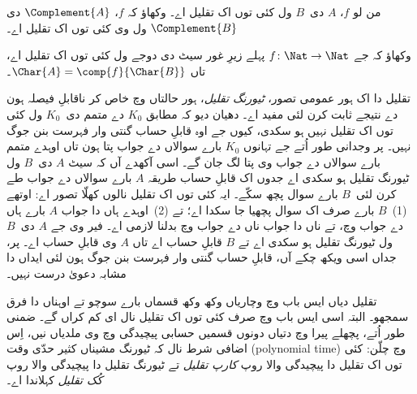 \documentclass[../../../include/open-logic-section]{subfiles}
\begin{document}
\begin{prob}
من لو $f$، $A$ دی~$B$ ول کئی
توں اک تقلیل اے۔ وکھاؤ کہ $f$،
$\Complement{A}$ دی
$\Complement{B}$ ول وی کئی توں
اک تقلیل اے۔
\end{prob}

\begin{prob}
وکھاؤ کہ جے $f\colon \Nat \to \Nat$
پہلے زیرِ غور سیٹ دی دوجے ول
کئی توں اک تقلیل اے، تاں $\Char{A}
= \comp{f}{\Char{B}}$۔
\end{prob}

\begin{digress}
تقلیل دا اک ہور عمومی تصور،
\emph{ٹیورنگ تقلیل}، ہور حالتاں وچ
خاص کر ناقابلِ فیصلہ ہون دے نتیجے
ثابت کرن لئی مفید اے۔ دھیان دیو
کہ  مطابق
$K_0$ دے متمم دی~$K_0$ ول کئی توں اک
تقلیل نہیں ہو سکدی، کیوں جے
اوہ قابلِ حساب گنتی وار فہرست
بنن جوگ نہیں۔ پر وجدانی طور اُتے
جے تہانوں $K_0$ بارے سوالاں دے
جواب پتا ہون تاں اوہدے متمم بارے
سوالاں دے جواب وی پتا لگ جان گے۔
اسی آکھدے آں کہ سیٹ $A$ دی~$B$ ول
ٹیورنگ تقلیل ہو سکدی اے جدوں اک قابلِ حساب
طریقہ $A$ بارے سوالاں دے جواب
طے کرن لئی~$B$ بارے سوال
پچھ سکّے۔ ایہ کئی توں
اک تقلیل نالوں کھلّا تصور اے:
اوتھے (1)~$B$ بارے صرف اک سوال
پچھیا جا سکدا اے؛ تے (2)~اوہدے
ہاں دا جواب $A$ بارے ہاں دے
جواب وچ، تے ناں دا جواب ناں دے
جواب وچ بدلنا لازمی اے۔ فیر وی
جے $A$ دی~$B$ ول ٹیورنگ تقلیل
ہو سکدی اے تے $B$ قابلِ
حساب اے تاں $A$ وی قابلِ حساب
اے۔ پر، جداں اسی ویکھ چکے آں،
قابلِ حساب گنتی وار فہرست بنن
جوگ ہون لئی ایداں دا مشابہ دعویٰ
درست نہیں۔

تقلیل دیاں ایس باب وچ وچاریاں
وکھ وکھ قسماں بارے سوچو تے
اوہناں دا فرق سمجھو۔ البتہ اسی
ایس باب وچ صرف کئی توں اک
تقلیل نال ای کم کراں گے۔ ضمنی
طور اُتے، پچھلے پیرا وچ دتیاں
دونوں قسمیں حسابی پیچیدگی وچ
وی ملدیاں نیں، اِس اضافی شرط
نال کہ ٹیورنگ مشیناں کثیر حدّی
وقت (polynomial time) وچ چلّن:
کئی توں اک تقلیل دا پیچیدگی
والا روپ \emph{کارپ تقلیل}
تے ٹیورنگ تقلیل دا پیچیدگی
والا روپ \emph{کُک تقلیل}
کہلاندا اے۔
\end{digress}
\end{document}
